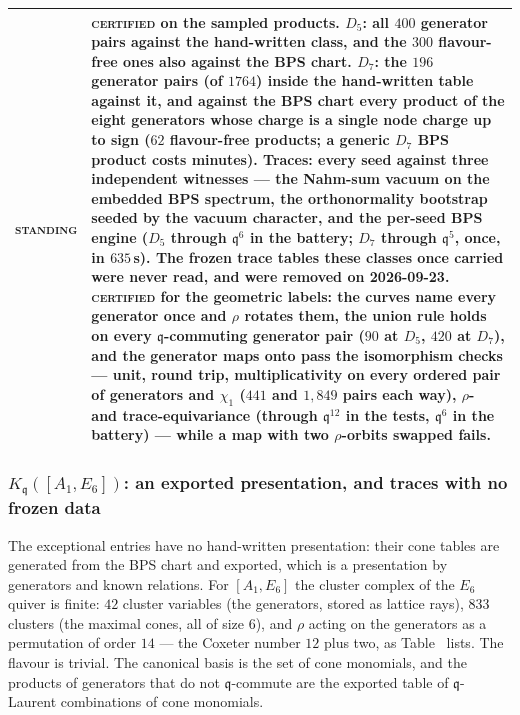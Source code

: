 \documentclass[11pt]{amsart}
\makeatletter
\newcommand\fq{\mathfrak{q}}
\theoremstyle{remark}
\newcommand{\pref}[1]{\@ifundefined{r@P-#1}{\textup{[\texttt{\detokenize{#1}}]}}{\ref{P-#1}}}
\newcommand{\CERTIFIED}{\textsc{certified}}
\newenvironment{machinery}{%
  \leavevmode\par\medskip\noindent
  \begin{tabular}{@{}>{\scshape}p{2.1cm}>{\raggedright\arraybackslash}p{\dimexpr\linewidth-2.5cm\relax}@{}}\toprule}%
  {\bottomrule\end{tabular}\par\medskip}
\makeatother
\begin{document}
\begin{machinery}
standing & \CERTIFIED{} on the sampled products.  $D_5$: all $400$ generator pairs against the hand-written class, and the $300$ flavour-free ones also against the BPS chart.  $D_7$: the $196$ generator pairs (of $1764$) inside the hand-written table against it, and against the BPS chart every product of the eight generators whose charge is a single node charge up to sign ($62$ flavour-free products; a generic $D_7$ BPS product costs minutes).  Traces: every seed against three independent witnesses --- the Nahm-sum vacuum on the embedded BPS spectrum, the orthonormality bootstrap seeded by the vacuum character, and the per-seed BPS engine ($D_5$ through $\fq^6$ in the battery; $D_7$ through $\fq^5$, once, in $635$\,s).  The frozen trace tables these classes once carried were never read, and were removed on 2026-09-23.  \CERTIFIED{} for the geometric labels: the curves name every generator once and $\rho$ rotates them, the union rule holds on every $\fq$-commuting generator pair ($90$ at $D_5$, $420$ at $D_7$), and the generator maps onto \code{A1DoddConeKAlg} pass the isomorphism checks --- unit, round trip, multiplicativity on every ordered pair of generators and $\chi_1$ ($441$ and $1{,}849$ pairs each way), $\rho$- and trace-equivariance (through $\fq^{12}$ in the tests, $\fq^6$ in the battery) --- while a map with two $\rho$-orbits swapped fails. \\
\end{machinery}

\subsubsection{$K_\fq([A_1,E_6])$: an exported presentation, and traces with no frozen data}\label{comp:e6}
The exceptional entries have no hand-written presentation: their cone tables
are generated from the BPS chart and exported, which is a presentation by
generators and known relations.  For $[A_1,E_6]$ the cluster
complex of the $E_6$ quiver is finite: $42$ cluster variables (the
generators, stored as lattice rays), $833$ clusters (the maximal cones, all
of size $6$), and $\rho$ acting on the generators as a permutation of order
$14$ --- the Coxeter number $12$ plus two, as Table~\pref{tab:finite_type}
lists.  The flavour is trivial.  The canonical basis is the set of cone
monomials, and the products of generators that do not $\fq$-commute are the
exported table of $\fq$-Laurent combinations of cone monomials.
\end{document}
